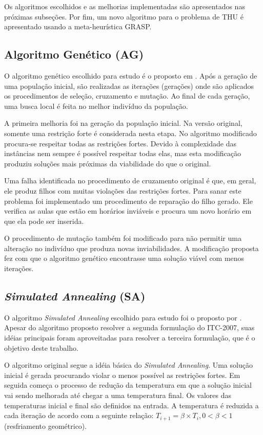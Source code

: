 \documentclass[11pt]{article}
\begin{document}
Os algoritmos escolhidos e as melhorias implementadas são apresentados nas próximas subseções. Por fim, um novo algoritmo para o problema de THU é apresentado usando a meta-heurística GRASP.

\subsection{Algoritmo Genético (AG)}

O algoritmo genético escolhido para estudo é o proposto em \cite{massoodian2008}. Após a geração de uma população inicial, são realizadas as iterações (gerações) onde são aplicados os procedimentos de seleção, cruzamento e mutação. Ao final de cada geração, uma busca local é feita no melhor indivíduo da população.

A primeira melhoria foi na geração da população inicial. Na versão original, somente uma restrição forte é considerada nesta etapa. No algoritmo modificado procura-se respeitar todas as restrições fortes. Devido à complexidade das instâncias nem sempre é possível respeitar todas elas, mas esta modificação produziu soluções mais próximas da viabilidade do que o original.

Uma falha identificada no procedimento de cruzamento original é que, em geral, ele produz filhos com muitas violações das restrições fortes. Para sanar este problema foi implementado um procedimento de reparação do filho gerado. Ele verifica as aulas que estão em horários inviáveis e procura um novo horário em que ela pode ser inserida.

O procedimento de mutação também foi modificado para não permitir uma alteração no indivíduo que produza novas inviabilidades. A modificação proposta fez com que o algoritmo genético encontrasse uma solução viável com menos iterações.

\subsection{\textit{Simulated Annealing} (SA)}

O algoritmo \textit{Simulated Annealing} escolhido para estudo foi o proposto por \cite{CDGS11b}. Apesar do algoritmo proposto resolver a segunda formulação do ITC-2007, suas idéias principais foram aproveitadas para resolver a terceira formulação, que é o objetivo deste trabalho.

O algoritmo original segue a idéia básica do \textit{Simulated Annealing}. Uma solução inicial é gerada procurando violar o menos possível as restrições fortes. Em seguida começa o processo de redução da temperatura em que a solução inicial vai sendo melhorada até chegar a uma temperatura final. Os valores das temperaturas inicial e final são definidos na entrada. A temperatura é reduzida a cada iteração de acordo com a seguinte relação: $T_{i+1} = \beta \times T_i, 0 < \beta < 1$ (resfriamento geométrico).
\end{document}
